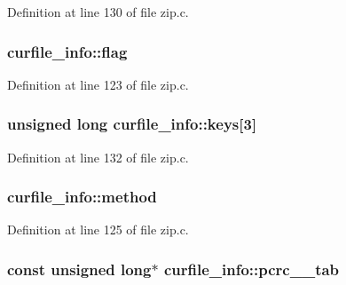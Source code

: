 Definition at line 130 of file zip.\-c.

\hypertarget{structcurfile__info_a9484e7dcce78fd7856e3048357115172}{
\subsubsection[{flag}]{ curfile\-\_\-info\-::flag}}\label{structcurfile__info_a9484e7dcce78fd7856e3048357115172}


Definition at line 123 of file zip.\-c.

\hypertarget{structcurfile__info_ac6836b3fb49829e3490cae1e8e319ed6}{
\subsubsection[{keys}]{\setlength{\rightskip}{0pt plus 5cm}unsigned {\bf long} curfile\-\_\-info\-::keys\mbox{[}3\mbox{]}}}\label{structcurfile__info_ac6836b3fb49829e3490cae1e8e319ed6}


Definition at line 132 of file zip.\-c.

\hypertarget{structcurfile__info_ac69364c19c39e2962e8f247f4b760d5f}{
\subsubsection[{method}]{ curfile\-\_\-info\-::method}}\label{structcurfile__info_ac69364c19c39e2962e8f247f4b760d5f}


Definition at line 125 of file zip.\-c.

\hypertarget{structcurfile__info_a9de6dd632a0a1eaad2729ae1f993fa71}{
\subsubsection[{pcrc\-\_\-32\-\_\-tab}]{\setlength{\rightskip}{0pt plus 5cm}const unsigned {\bf long}$\ast$ curfile\-\_\-info\-::pcrc\-\_\-\_\-tab}}\label{structcurfile__info_a9de6dd632a0a1eaad2729ae1f993fa71}



